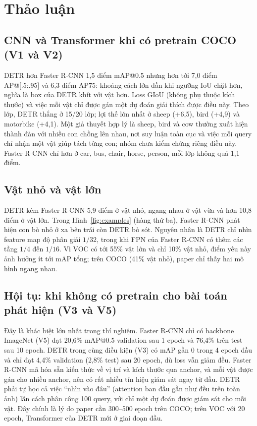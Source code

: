 \documentclass[11pt, a4paper]{article}
\begin{document}
\section{Thảo luận}

\subsection{CNN và Transformer khi có pretrain COCO (V1 và V2)}
DETR hơn Faster R-CNN 1,5 điểm mAP@0.5 nhưng hơn tới 7,0 điểm AP@[.5:.95] và 6,3 điểm AP75: khoảng cách lớn dần khi ngưỡng IoU chặt hơn, nghĩa là box của DETR khít với vật hơn. Loss GIoU (không phụ thuộc kích thước) và việc mỗi vật chỉ được gán một dự đoán giải thích được điều này. Theo lớp, DETR thắng ở 15/20 lớp; lợi thế lớn nhất ở sheep (+6,5), bird (+4,9) và motorbike (+4,1). Một giả thuyết hợp lý là sheep, bird và cow thường xuất hiện thành đàn với nhiều con chồng lên nhau, nơi suy luận toàn cục và việc mỗi query chỉ nhận một vật giúp tách từng con; nhóm chưa kiểm chứng riêng điều này. Faster R-CNN chỉ hơn ở car, bus, chair, horse, person, mỗi lớp không quá 1,1 điểm.

\subsection{Vật nhỏ và vật lớn}
DETR kém Faster R-CNN 5,9 điểm ở vật nhỏ, ngang nhau ở vật vừa và hơn 10,8 điểm ở vật lớn. Trong Hình~\ref{fig:examples} (hàng thứ ba), Faster R-CNN phát hiện con bò nhỏ ở xa bên trái còn DETR bỏ sót. Nguyên nhân là DETR chỉ nhìn feature map độ phân giải $1/32$, trong khi FPN của Faster R-CNN có thêm các tầng $1/4$ đến $1/16$. Vì VOC có tới 55\% vật lớn và chỉ 10\% vật nhỏ, điểm yếu này ảnh hưởng ít tới mAP tổng; trên COCO (41\% vật nhỏ), paper chỉ thấy hai mô hình ngang nhau.

\subsection{Hội tụ: khi không có pretrain cho bài toán phát hiện (V3 và V5)}
Đây là khác biệt lớn nhất trong thí nghiệm. Faster R-CNN chỉ có backbone ImageNet (V5) đạt 20,6\% mAP@0.5 validation sau 1 epoch và 76,4\% trên test sau 10 epoch. DETR trong cùng điều kiện (V3) có mAP gần 0 trong 4 epoch đầu và chỉ đạt 4,4\% validation (2,8\% test) sau 20 epoch, dù loss vẫn giảm đều. Faster R-CNN mã hóa sẵn kiến thức về vị trí và kích thước qua anchor, và mỗi vật được gán cho nhiều anchor, nên có rất nhiều tín hiệu giám sát ngay từ đầu. DETR phải tự học cả việc ``nhìn vào đâu'' (attention ban đầu gần như đều trên toàn ảnh) lẫn cách phân công 100 query, với chỉ một dự đoán được giám sát cho mỗi vật. Đây chính là lý do paper cần 300--500 epoch trên COCO; trên VOC với 20 epoch, Transformer của DETR mới ở giai đoạn đầu.
\end{document}

